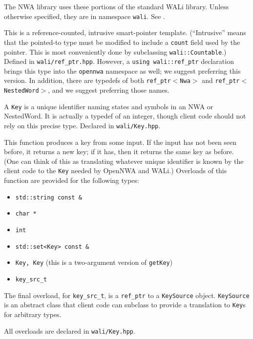 The NWA library uses these portions of the standard WALi library. Unless
otherwise specified, they are in namespace \texttt{wali}. See \cite{wali}.

\begin{functionlist}
   This is a reference-counted, intrusive
    smart-pointer template. (``Intrusive'' means that the pointed-to type
    must be modified to include a \texttt{count} field used by the
    pointer. This is most conveniently done by subclassing
    \texttt{wali::Countable}.) Defined in
    \texttt{wali/ref\_ptr.hpp}. However, a \texttt{using wali::ref\_ptr}
    declaration brings this type into the \texttt{opennwa} namespace as well;
    we suggest preferring this version. In addition, there are typedefs of
    both \texttt{ref\_ptr$<$Nwa$>$} and \texttt{ref\_ptr$<$NestedWord$>$},
    and we suggest preferring those names.

   A \texttt{Key} is a unique identifier naming states and symbols in an
    NWA or NestedWord. It is actually a typedef of an integer, though client
    code should not rely on this precise type. Declared in
    \texttt{wali/Key.hpp}.

   This function produces a key from some input. If
    the input has not been seen before, it returns a new key; if it has, then
    it returns the same key as before. (One can think of this as translating
    whatever unique identifier is known by the client code to the
    \texttt{Key} needed by OpenNWA and WALi.) Overloads of this function are provided for
    the following types:
    \begin{itemize}
      \item \texttt{std::string const \&}
      \item \texttt{char *}
      \item \texttt{int}
      \item \texttt{std::set<Key> const \&}
      \item \texttt{Key, Key} (this is a two-argument version of
        \texttt{getKey})
      \item \texttt{key\_src\_t}
    \end{itemize}
    The final overload, for \texttt{key\_src\_t}, is a \texttt{ref\_ptr} to a
    \texttt{KeySource} object. \texttt{KeySource} is an abstract class that
    client code can subclass to provide a translation to \texttt{Key}s for
    arbitrary types.

    All overloads are declared in \texttt{wali/Key.hpp}.


\end{functionlist}
